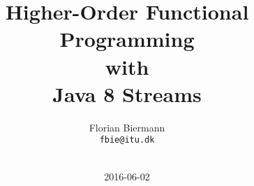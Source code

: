 \documentclass{beamer}
\title{Higher-Order Functional Programming\\with\\Java 8 Streams}
\author{Florian Biermann \\\small{\texttt{fbie@itu.dk}} \\~}
\institute{IT University of Copenhagen \& UCAS}
\date{2016-06-02}
\begin{document}
\begin{frame}
  \titlepage{}
\end{frame}
\end{document}
